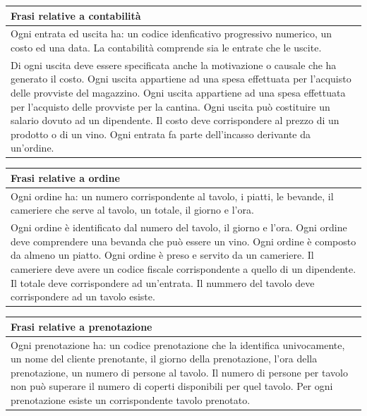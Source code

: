 \begin{longtable}{|p{15.5cm}|}
    \hline
    \textbf{Frasi relative a contabilità} \\ \hline
    Ogni entrata ed uscita ha: un codice idenficativo progressivo numerico, un costo ed una data.
    La contabilità comprende sia le entrate che le uscite.\\
Di ogni uscita deve essere specificata anche la motivazione o causale che ha generato
il costo. 
Ogni uscita appartiene ad una spesa effettuata per l’acquisto delle provviste del magazzino.
Ogni uscita appartiene ad una spesa effettuata per l’acquisto delle provviste per la
cantina.
Ogni uscita può costituire un salario dovuto ad un dipendente.
Il costo deve corrispondere al prezzo di un prodotto o di un vino.
Ogni entrata fa parte dell’incasso derivante da un’ordine.
    \\ \hline
\end{longtable}

\begin{longtable}{|p{15.5cm}|}
    \hline
    \textbf{Frasi relative a ordine} \\ \hline
    Ogni ordine ha: un numero corrispondente al tavolo, i piatti, le bevande, il cameriere che serve al tavolo, un totale, il giorno e l'ora. \\
Ogni ordine è identificato dal numero del tavolo, il giorno e l'ora. 
Ogni ordine deve comprendere una bevanda che può essere un vino. 
Ogni ordine è composto da almeno un piatto.  
Ogni ordine è preso e servito da un cameriere. 
Il cameriere deve avere un codice fiscale corrispondente a quello di un dipendente. 
Il totale deve corrispondere ad un'entrata. 
Il nummero del tavolo deve corrispondere ad un tavolo esiste.
    \\ \hline
\end{longtable}

\begin{longtable}{|p{15.5cm}|}
    \hline
    \textbf{Frasi relative a prenotazione} \\ \hline
    Ogni prenotazione ha: un codice prenotazione che la identifica univocamente, un nome del cliente prenotante, il giorno della prenotazione, l'ora della prenotazione, un numero di persone al tavolo. 
Il numero di persone per tavolo non può superare il numero di coperti disponibili per quel tavolo. 
Per ogni prenotazione esiste un corrispondente tavolo prenotato.
    \\ \hline
\end{longtable}

